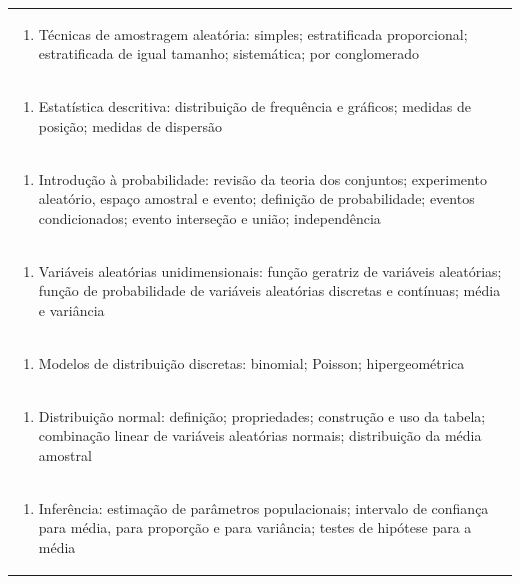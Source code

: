 \documentclass[11pt]{article}
\begin{document}
\begin{center}
\begin{longtable}{|p{4cm}|p{4cm}|p{4cm}|p{4cm}|}
\multicolumn{4}{|p{\dimexpr 16cm + 6\tabcolsep\relax}|}{\begin{enumerate}[start=2]\item Técnicas de amostragem aleatória: simples; estratificada proporcional; estratificada de igual tamanho; sistemática; por conglomerado\end{enumerate}}\\
\multicolumn{4}{|p{\dimexpr 16cm + 6\tabcolsep\relax}|}{\begin{enumerate}[start=3]\item Estatística descritiva: distribuição de frequência e gráficos; medidas de posição; medidas de dispersão\end{enumerate}}\\
\multicolumn{4}{|p{\dimexpr 16cm + 6\tabcolsep\relax}|}{\begin{enumerate}[start=4]\item Introdução à probabilidade: revisão da teoria dos conjuntos; experimento aleatório, espaço amostral e evento; definição de probabilidade; eventos condicionados; evento interseção e união; independência\end{enumerate}}\\
\multicolumn{4}{|p{\dimexpr 16cm + 6\tabcolsep\relax}|}{\begin{enumerate}[start=5]\item Variáveis aleatórias unidimensionais: função geratriz de variáveis aleatórias; função de probabilidade de variáveis aleatórias discretas e contínuas; média e variância\end{enumerate}}\\
\multicolumn{4}{|p{\dimexpr 16cm + 6\tabcolsep\relax}|}{\begin{enumerate}[start=6]\item Modelos de distribuição discretas: binomial; Poisson; hipergeométrica\end{enumerate}}\\
\multicolumn{4}{|p{\dimexpr 16cm + 6\tabcolsep\relax}|}{\begin{enumerate}[start=7]\item Distribuição normal: definição; propriedades; construção e uso da tabela; combinação linear de variáveis aleatórias normais; distribuição da média amostral\end{enumerate}}\\
\multicolumn{4}{|p{\dimexpr 16cm + 6\tabcolsep\relax}|}{\begin{enumerate}[start=8]\item Inferência: estimação de parâmetros populacionais; intervalo de confiança para média, para proporção e para variância; testes de hipótese para a média\end{enumerate}}\\

\end{longtable}
\end{center}
\end{document}
